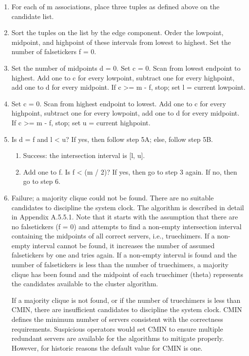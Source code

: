\begin{enumerate}
  \item For each of m associations, place three tuples as defined above
    on the candidate list.

  \item Sort the tuples on the list by the edge component.  Order the
    lowpoint, midpoint, and highpoint of these intervals from lowest to
    highest.  Set the number of falsetickers f = 0.

  \item Set the number of midpoints d = 0.  Set c = 0.  Scan from lowest
    endpoint to highest.  Add one to c for every lowpoint, subtract one
    for every highpoint, add one to d for every midpoint.  If c >= m - f,
    stop; set l = current lowpoint.

  \item Set c = 0.  Scan from highest endpoint to lowest.  Add one to c
    for every highpoint, subtract one for every lowpoint, add one to d
    for every midpoint.  If c >= m - f, stop; set u = current highpoint.

  \item Is d = f and l < u?  If yes, then follow step 5A; else, follow
    step 5B.

    \begin{enumerate}[5A.]
      \item Success: the intersection interval is [l, u].

      \item Add one to f.  Is f < (m / 2)?  If yes, then go to step 3 again.
        If no, then go to step 6.
    \end{enumerate}

  \item Failure; a majority clique could not be found.  There are no
    suitable candidates to discipline the system clock.
    The algorithm is described in detail in Appendix A.5.5.1.  Note that
    it starts with the assumption that there are no falsetickers (f = 0)
    and attempts to find a non-empty intersection interval containing the
    midpoints of all correct servers, i.e., truechimers.  If a non-empty
    interval cannot be found, it increases the number of assumed
    falsetickers by one and tries again.  If a non-empty interval is
    found and the number of falsetickers is less than the number of
    truechimers, a majority clique has been found and the midpoint of
    each truechimer (theta) represents the candidates available to the
    cluster algorithm.

    If a majority clique is not found, or if the number of truechimers is
    less than CMIN, there are insufficient candidates to discipline the
    system clock.  CMIN defines the minimum number of servers consistent
    with the correctness requirements.  Suspicious operators would set
    CMIN to ensure multiple redundant servers are available for the
    algorithms to mitigate properly.  However, for historic reasons the
    default value for CMIN is one.
\end{enumerate}

